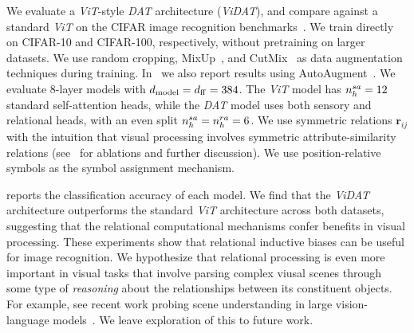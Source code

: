 We evaluate a \textit{ViT}-style \textit{DAT} architecture (\textit{ViDAT}), and compare against a standard \textit{ViT} on the CIFAR image recognition benchmarks~\citep{cifar_dataset}. We train directly on CIFAR-10 and CIFAR-100, respectively, without pretraining on larger datasets. We use random cropping, MixUp~\citep{zhang2018mixup}, and CutMix~\citep{yun2019cutmix} as data augmentation techniques during training. In~ we also report results using AutoAugment~\citep{cubuk2019autoaugmentlearningaugmentationpolicies}. We evaluate 8-layer models with $d_{\mathrm{model}} = d_{\mathrm{ff}} = 384$. The \textit{ViT} model has $n_h^{sa} = 12$ standard self-attention heads, while the \textit{DAT} model uses both sensory and relational heads, with an even split $n_h^{sa} = n_h^{ra} = 6$. We use symmetric relations $\bm{r}_{ij}$ with the intuition that visual processing involves symmetric attribute-similarity relations (see~ for ablations and further discussion). We use position-relative symbols as the symbol assignment mechanism.

 reports the classification accuracy of each model. We find that the \textit{ViDAT} architecture outperforms the standard \textit{ViT} architecture across both datasets, suggesting that the relational computational mechanisms confer benefits in visual processing. These experiments show that relational inductive biases can be useful for image recognition. We hypothesize that relational processing is even more important in visual tasks that involve parsing complex viusal scenes through some type of \textit{reasoning} about the relationships between its constituent objects. For example, see recent work probing scene understanding in large vision-language models~\citep{johnson2017clevr,zerroug2022benchmark,zhao2024benchmarking}. We leave exploration of this to future work.



